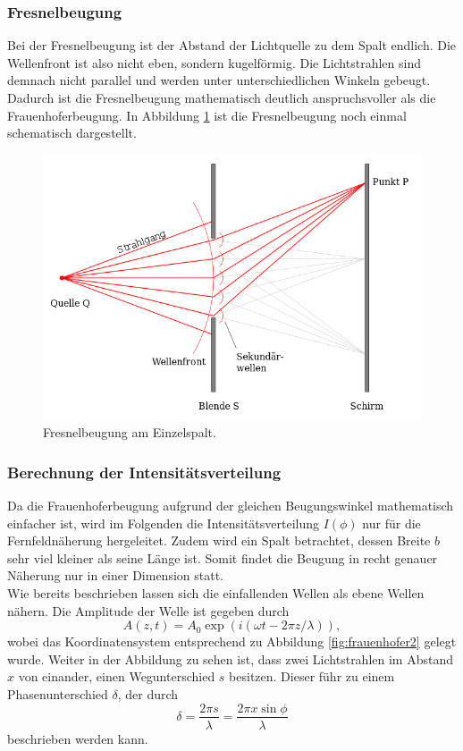 \subsubsection*{Fresnelbeugung}
Bei der Fresnelbeugung ist der Abstand der Lichtquelle zu dem Spalt endlich. Die Wellenfront ist also nicht eben, sondern kugelförmig. Die Lichtstrahlen sind
demnach nicht parallel und werden unter unterschiedlichen Winkeln gebeugt. Dadurch ist die Fresnelbeugung mathematisch deutlich anspruchsvoller als die 
Frauenhoferbeugung. In Abbildung \ref{fig:fresnel} ist die Fresnelbeugung noch einmal schematisch dargestellt.
\begin{figure}[H]
    \centering
    \includegraphics[scale = 0.45]{pictures/fresnel.png}
    \caption{Fresnelbeugung am Einzelspalt. \cite{AP02}}
    \label{fig:fresnel}
\end{figure}
\noindent

\subsubsection*{Berechnung der Intensitätsverteilung}
\label{sec:intensität}
Da die Frauenhoferbeugung aufgrund der gleichen Beugungswinkel mathematisch einfacher ist, wird im Folgenden die Intensitätsverteilung $I(\phi)$
nur für die Fernfeldnäherung hergeleitet. Zudem wird ein Spalt betrachtet, dessen Breite $b$ sehr viel kleiner als seine Länge ist. Somit findet
die Beugung in recht genauer Näherung nur in einer Dimension statt.
\\\noindent
Wie bereits beschrieben lassen sich die einfallenden Wellen als ebene Wellen nähern. Die Amplitude der Welle ist gegeben durch
\begin{equation*}
    A(z,t)=A_0\exp{(i(\omega t-2\pi z/\lambda))}    ,
    \label{eqn:ebenewelle}
\end{equation*}
wobei das Koordinatensystem entsprechend zu Abbildung \ref{fig:frauenhofer2} gelegt wurde. Weiter in der Abbildung zu sehen ist, dass zwei
Lichtstrahlen im Abstand $x$ von einander, einen Wegunterschied $s$ besitzen. Dieser führ zu einem Phasenunterschied $\delta$, der durch
\begin{equation*}
    \delta=\frac{2\pi s}{\lambda}=\frac{2\pi x \sin{\phi}}{\lambda}
    \label{eqn:phase}
\end{equation*}
beschrieben werden kann.

